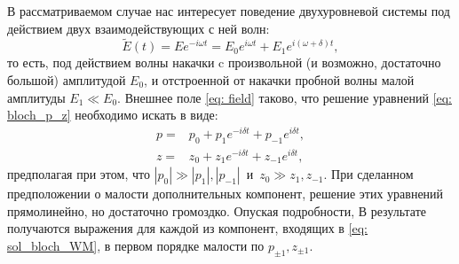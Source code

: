 В рассматриваемом случае нас интересует поведение двухуровневой системы под действием двух взаимодействующих с ней волн:
\begin{equation}
\tilde{E}(t) = Ee^{-i\omega t} = E_0e^{i\omega t} + E_1e^{i(\omega+\delta) t},
\label{eq: field}
\end{equation}
то есть, под действием волны накачки c произвольной (и возможно, достаточно большой) амплитудой $E_0$, и отстроенной от накачки пробной волны малой амплитуды $E_1 \ll E_0$. Внешнее поле \eqref{eq: field} таково, что решение уравнений \eqref{eq: bloch_p_z} необходимо искать в виде:
\begin{align}
p =& p_0 + p_1 e^{-i\delta t} + p_{-1}e^{i\delta t}, \\
z =& z_0 + z_1 e^{-i\delta t} + z_{-1}e^{i\delta t},
\label{eq: sol_bloch_WM}
\end{align}
предполагая при этом, что $|p_0| \gg |p_1|, |p_{-1}|$~и~$z_0 \gg z_1, z_{-1}$.  При сделанном предположении о малости дополнительных компонент, решение этих уравнений прямолинейно, но достаточно громоздко. Опуская подробности, В результате получаются выражения для каждой из компонент, входящих в \eqref{eq: sol_bloch_WM}, в первом порядке малости по $p_{\pm 1}, z_{\pm 1}$.

